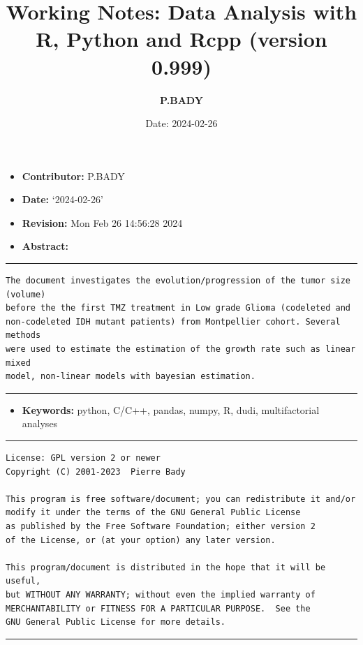 \documentclass[
  10pt,
]{article}
\title{\textbf{Working Notes:} Data Analysis with R, Python and Rcpp
(version 0.999)}
\author{\textbf{P.BADY}}
\date{Date: 2024-02-26}
\providecommand{\tightlist}{%
  \setlength{\itemsep}{0pt}\setlength{\parskip}{0pt}}
\begin{document}
\maketitle

{
\setcounter{tocdepth}{5}
\tableofcontents
}
\newpage

\begin{itemize}
\tightlist
\item
  \textbf{Contributor:} P.BADY
\item
  \textbf{Date:} `2024-02-26'
\item
  \textbf{Revision:} Mon Feb 26 14:56:28 2024
\item
  \textbf{Abstract:}
\end{itemize}

\rule{1\linewidth}{0.5pt}

\begin{verbatim}
The document investigates the evolution/progression of the tumor size (volume) 
before the the first TMZ treatment in Low grade Glioma (codeleted and 
non-codeleted IDH mutant patients) from Montpellier cohort. Several methods 
were used to estimate the estimation of the growth rate such as linear mixed 
model, non-linear models with bayesian estimation.
\end{verbatim}

\rule{1\linewidth}{0.5pt}

\begin{itemize}
\tightlist
\item
  \textbf{Keywords:} python, C/C++, pandas, numpy, R, dudi,
  multifactorial analyses
\end{itemize}

\rule{1\linewidth}{0.5pt}

\begin{verbatim}
License: GPL version 2 or newer
Copyright (C) 2001-2023  Pierre Bady

This program is free software/document; you can redistribute it and/or
modify it under the terms of the GNU General Public License
as published by the Free Software Foundation; either version 2
of the License, or (at your option) any later version.

This program/document is distributed in the hope that it will be useful,
but WITHOUT ANY WARRANTY; without even the implied warranty of
MERCHANTABILITY or FITNESS FOR A PARTICULAR PURPOSE.  See the
GNU General Public License for more details.
\end{verbatim}

\rule{1\linewidth}{0.5pt}
\end{document}
